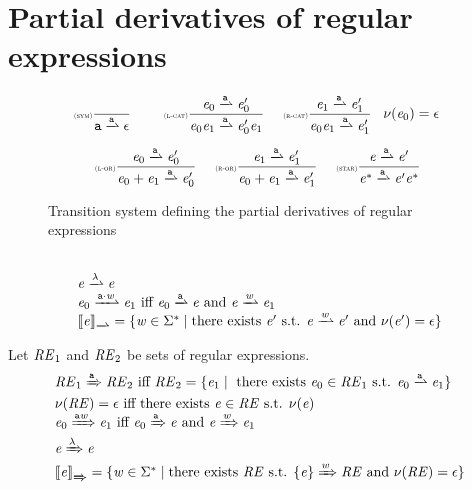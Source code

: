 \section{Partial derivatives of regular expressions}\label{sec:parDer}

\begin{figure}
 $$
  \begin{array}{c}
   \Rule{sym}{}{\sym\parDer{\sym}\eps}\quad
   \Rule{l-cat}{\re_0\parDer{\sym}\re'_0}{\re_0\catop\re_1\parDer{\sym}\re'_0\catop\re_1}{}\quad
   \Rule{r-cat}{\re_1\parDer{\sym}\re'_1}{\re_0\catop\re_1\parDer{\sym}\re'_1}{\hasEps{\re_0}=\eps} \\[4ex]
   \Rule{l-or}{\re_0\parDer{\sym}\re'_0}{\re_0\orop\re_1\parDer{\sym}\re'_0}{} \quad
   \Rule{r-or}{\re_1\parDer{\sym}\re'_1}{\re_0\orop\re_1\parDer{\sym}\re'_1}{} \quad
   \Rule{star}{\re\parDer{\sym}\re'}{\starop{\re}\parDer{\sym}\re'\starop{\re}}{}
  \end{array}
 $$
 \caption{Transition system defining the partial derivatives of regular expressions}
 \label{parDer}
\end{figure}

\begin{definition}
 \[
  \begin{array}{l}
   \\
   \re\parDer{\emptyWord}\re                                                                                        \\
   \re_0\parDer{\sym\strcatop\word}\re_1 \mbox{ iff } \re_0\parDer{\sym}{}\re \mbox{ and } \re\parDer{\word}{}\re_1 \\
   \opSem{\re}{\parDer{}}=\{\word\in\wordUniv \mid \mbox{there exists } \re' \mbox{ s.t. } \re\parDer{\word}\re' \mbox{ and } \hasEps{\re'}=\eps\}
  \end{array}
 \]
\end{definition}

\begin{definition}
 Let $\mathit {RE}_1$ and $\mathit {RE}_2$ be sets of regular expressions.
 \[
  \begin{array}{l}
   \reSet_1\derSet{\sym}\reSet_2 \mbox{ iff } \reSet_2=\{\re_1 \mid \mbox{ there exists } \re_0\in\reSet_1 \mbox{ s.t. } \re_0\parDer{\sym}{}\re_1 \} \\
   \hasEps{\reSet}=\eps \mbox{ iff there exists } \re\in\reSet \mbox{ s.t. } \hasEps{\re}                                                             \\
   \re_0\derSet{\sym\word}\re_1 \mbox{ iff } \re_0\derSet{\sym}\re \mbox{ and } \re\derSet{\word}\re_1                                                \\
   \re\derSet{\emptyWord}{}\re                                                                                                                        \\
   \opSem{\re}{\derSet{}}=\{\word\in\wordUniv \mid \mbox{there exists } \reSet \mbox{ s.t. } \{\re\}\derSet{\word}\reSet \mbox{ and } \hasEps{\reSet}=\eps\}
  \end{array}
 \]
\end{definition}

